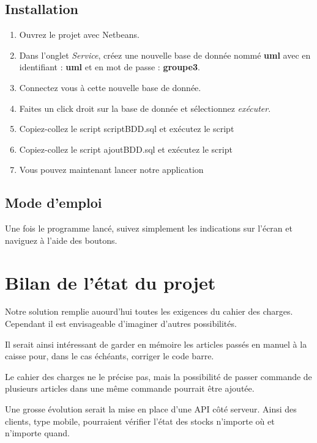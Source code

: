 \subsection{Installation}
\begin{enumerate}
	\item Ouvrez le projet avec Netbeans.
	\item Dans l'onglet \textit{Service}, créez une nouvelle base de donnée nommé \textbf{uml} avec en identifiant : \textbf{uml} et en mot de passe : \textbf{groupe3}. 
	\item Connectez vous à cette nouvelle base de donnée.
	\item Faites un click droit sur la base de donnée et sélectionnez \textit{exécuter}.
	\item Copiez-collez le script scriptBDD.sql et exécutez le script
	\item Copiez-collez le script ajoutBDD.sql et exécutez le script
	\item Vous pouvez maintenant lancer notre application
\end{enumerate}

\subsection{Mode d'emploi}
Une fois le programme lancé, suivez simplement les indications sur l'écran et naviguez à l'aide des boutons.

\section{Bilan de l'état du projet}
Notre solution remplie auourd'hui toutes les exigences du cahier des charges. Cependant il est envisageable d'imaginer d'autres possibilités. 

Il serait ainsi intéressant de garder en mémoire les articles passés en manuel à la caisse pour, dans le cas échéants, corriger le code barre.

Le cahier des charges ne le précise pas, mais la possibilité de passer commande de plusieurs articles dans une même commande pourrait être ajoutée. 

Une grosse évolution serait la mise en place d'une API côté serveur. Ainsi des clients, type mobile, pourraient vérifier l'état des stocks n'importe où et n'importe quand. 